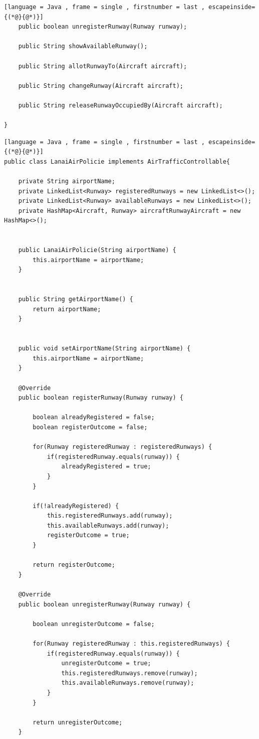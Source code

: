 \documentclass{article}
\begin{document}
\begin{sloppy}
\begin{lstlisting}[language = Java , frame = single , firstnumber = last , escapeinside={(*@}{@*)}]
	public boolean unregisterRunway(Runway runway);
	
	public String showAvailableRunway();
	
	public String allotRunwayTo(Aircraft aircraft);
	
	public String changeRunway(Aircraft aircraft);
	
	public String releaseRunwayOccupiedBy(Aircraft aircraft);
	
}

\end{lstlisting}

\begin{lstlisting}[language = Java , frame = single , firstnumber = last , escapeinside={(*@}{@*)}]
public class LanaiAirPolicie implements AirTrafficControllable{

	private String airportName;
	private LinkedList<Runway> registeredRunways = new LinkedList<>();
	private LinkedList<Runway> availableRunways = new LinkedList<>();
	private HashMap<Aircraft, Runway> aircraftRunwayAircraft = new HashMap<>();
	
	
	public LanaiAirPolicie(String airportName) {
		this.airportName = airportName;
	}
	
	
	public String getAirportName() {
		return airportName;
	}


	public void setAirportName(String airportName) {
		this.airportName = airportName;
	}

	@Override
	public boolean registerRunway(Runway runway) {
		
		boolean alreadyRegistered = false;
		boolean registerOutcome = false;
		
		for(Runway registeredRunway : registeredRunways) {
			if(registeredRunway.equals(runway)) {
				alreadyRegistered = true;
			}
		}
		
		if(!alreadyRegistered) {
			this.registeredRunways.add(runway);
			this.availableRunways.add(runway);
			registerOutcome = true;
		}
		
		return registerOutcome;
	}

	@Override
	public boolean unregisterRunway(Runway runway) {
		
		boolean unregisterOutcome = false;
		
		for(Runway registeredRunway : this.registeredRunways) {
			if(registeredRunway.equals(runway)) {
				unregisterOutcome = true;
				this.registeredRunways.remove(runway);
				this.availableRunways.remove(runway);
			}
		}
		
		return unregisterOutcome;
	}


\end{lstlisting}
\end{sloppy}
\end{document}
